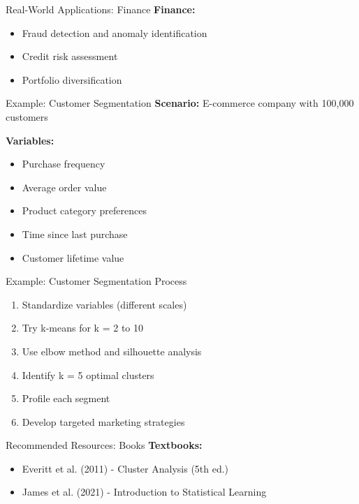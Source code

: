 \documentclass[aspectratio=169,ignorenonframetext]{beamer}
\begin{document}
\begin{frame}{Real-World Applications: Finance}
\textbf{Finance:}

\begin{itemize}
\item
  Fraud detection and anomaly identification
\item
  Credit risk assessment
\item
  Portfolio diversification
\end{itemize}
\end{frame}

\begin{frame}{Example: Customer Segmentation}
\textbf{Scenario:} E-commerce company with 100,000 customers

\textbf{Variables:}

\begin{itemize}
\item
  Purchase frequency
\item
  Average order value
\item
  Product category preferences
\item
  Time since last purchase
\item
  Customer lifetime value
\end{itemize}
\end{frame}

\begin{frame}{Example: Customer Segmentation Process}
\begin{enumerate}
\item
  Standardize variables (different scales)
\item
  Try k-means for k = 2 to 10
\item
  Use elbow method and silhouette analysis
\item
  Identify k = 5 optimal clusters
\item
  Profile each segment
\item
  Develop targeted marketing strategies
\end{enumerate}
\end{frame}

\begin{frame}{Recommended Resources: Books}
\textbf{Textbooks:}

\begin{itemize}
\item
  Everitt et al. (2011) - Cluster Analysis (5th ed.)
\item
  James et al. (2021) - Introduction to Statistical Learning
\end{itemize}
\end{frame}
\end{document}
